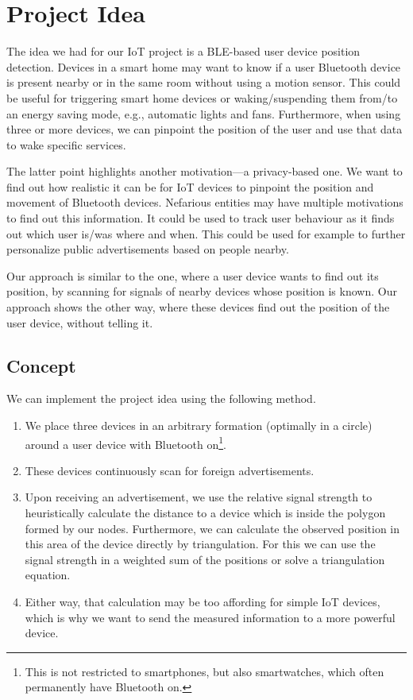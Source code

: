 


\maketitle

\section{Project Idea}
The idea we had for our IoT project is a BLE-based user device position detection.
Devices in a smart home may want to know if a user Bluetooth device is present nearby or in the same room without using a motion sensor.
This could be useful for triggering smart home devices or waking/suspending them from/to an energy saving mode, e.g., automatic lights and fans.
Furthermore, when using three or more devices, we can pinpoint the position of the user and use that data to wake specific services.

The latter point highlights another motivation---a privacy-based one.
We want to find out how realistic it can be for IoT devices to pinpoint the position and movement of Bluetooth devices.
Nefarious entities may have multiple motivations to find out this information.
It could be used to track user behaviour as it finds out which user is/was where and when.
This could be used for example to further personalize public advertisements based on people nearby.

Our approach is similar to the one, where a user device wants to find out its position, by scanning for signals of nearby devices whose position is known.
Our approach shows the other way, where these devices find out the position of the user device, without telling it.

\subsection{Concept}
We can implement the project idea using the following method.
\begin{enumerate}
    \item We place three devices in an arbitrary formation (optimally in a circle) around a user device with Bluetooth on\footnote{This is not restricted to smartphones, but also smartwatches, which often permanently have Bluetooth on.}.

    \item These devices continuously scan for foreign advertisements.

    \item Upon receiving an advertisement, we use the relative signal strength to heuristically calculate the distance to a device which is inside the polygon formed by our nodes.
        Furthermore, we can calculate the observed position in this area of the device directly by triangulation.
        For this we can use the signal strength in a weighted sum of the positions or solve a triangulation equation.

    \item Either way, that calculation may be too affording for simple IoT devices, which is why we want to send the measured information to a more powerful device.
\end{enumerate}

